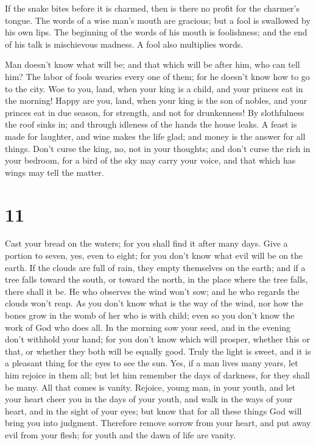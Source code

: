  If the snake bites before it is charmed, then is there no
profit for the charmer's tongue.  The words of a wise man's
mouth are gracious; but a fool is swallowed by his own lips.
 The beginning of the words of his mouth is foolishness;
and the end of his talk is mischievous madness.  A fool
also multiplies words.

Man doesn't know what will be; and that which will be after him, who can
tell him?  The labor of fools wearies every one of them;
for he doesn't know how to go to the city.  Woe to you,
land, when your king is a child, and your princes eat in the morning!
 Happy are you, land, when your king is the son of nobles,
and your princes eat in due season, for strength, and not for
drunkenness!  By slothfulness the roof sinks in; and
through idleness of the hands the house leaks.  A feast is
made for laughter, and wine makes the life glad; and money is the answer
for all things.  Don't curse the king, no, not in your
thoughts; and don't curse the rich in your bedroom, for a bird of the
sky may carry your voice, and that which has wings may tell the matter.

\hypertarget{section-10}{%
\section{11}\label{section-10}}

 Cast your bread on the waters; for you shall find it after
many days.  Give a portion to seven, yes, even to eight; for
you don't know what evil will be on the earth.  If the
clouds are full of rain, they empty themselves on the earth; and if a
tree falls toward the south, or toward the north, in the place where the
tree falls, there shall it be.  He who observes the wind
won't sow; and he who regards the clouds won't reap.  As you
don't know what is the way of the wind, nor how the bones grow in the
womb of her who is with child; even so you don't know the work of God
who does all.  In the morning sow your seed, and in the
evening don't withhold your hand; for you don't know which will prosper,
whether this or that, or whether they both will be equally good.
 Truly the light is sweet, and it is a pleasant thing for
the eyes to see the sun.  Yes, if a man lives many years,
let him rejoice in them all; but let him remember the days of darkness,
for they shall be many. All that comes is vanity.  Rejoice,
young man, in your youth, and let your heart cheer you in the days of
your youth, and walk in the ways of your heart, and in the sight of your
eyes; but know that for all these things God will bring you into
judgment.  Therefore remove sorrow from your heart, and put
away evil from your flesh; for youth and the dawn of life are vanity.

